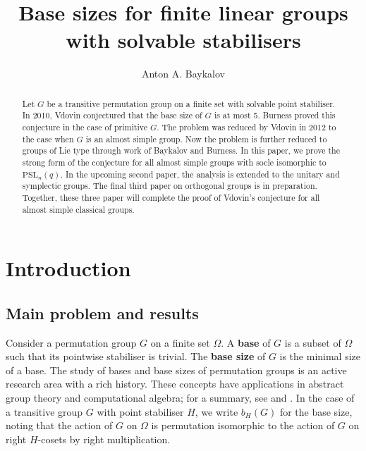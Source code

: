 \documentclass[a4paper,reqno,11pt]{amsart}
\title{Base sizes for finite linear groups with solvable stabilisers}
\author{Anton A. Baykalov}
\theoremstyle{definition}
\theoremstyle{remark}
\numberwithin{equation}{section}
\newcommand{\PSL}{{\mathrm{PSL}}}
\begin{document}
\begin{abstract}
Let $G$ be a transitive permutation group on a finite set with solvable point stabiliser. In 2010, Vdovin  conjectured that the base size of $G$ is at most 5. Burness proved this conjecture in the case of primitive $G$. The problem was reduced by Vdovin in 2012 to the case when $G$ is an almost simple group. Now the problem is further reduced to groups of Lie type through work of Baykalov and Burness. In this paper, we prove the strong form of the conjecture for all almost simple groups with socle isomorphic to $\PSL_n(q).$  
 In the upcoming second paper, the analysis is extended to the unitary and symplectic groups. The final third paper on orthogonal groups is in preparation. Together, these three paper will complete the proof of Vdovin's conjecture for all almost simple classical groups. 
\end{abstract}






\maketitle



\section{Introduction}

\subsection{Main problem and results}

Consider a permutation group $G$ on a finite set $\Omega.$ A { \bf base } of $G$ is a subset of $\Omega$ such that its pointwise stabiliser is trivial. The {\bf base size} of $G$ is the minimal size of a base. The study of bases and base sizes of permutation groups is an active research area with a rich history. These concepts have applications in abstract group theory and computational algebra; for a summary, see \cite{bailey} and  \cite{sfa}. In the case of a transitive group $G$ with point stabiliser $H$, we write $b_H(G)$ for the base size, noting that the action of $G$ on $\Omega$  is permutation isomorphic to the action of $G$ on right $H$-cosets by right multiplication.  
\end{document}
